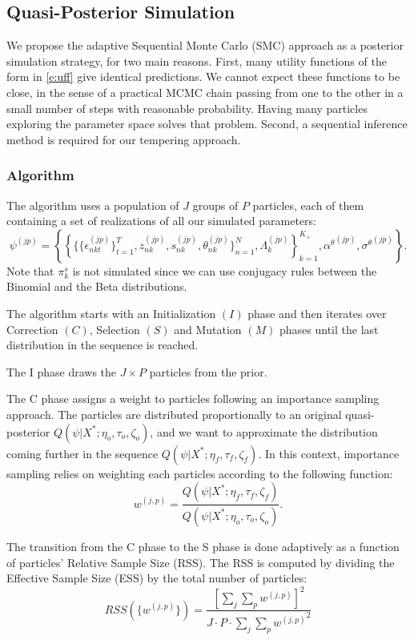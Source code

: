 \documentclass[12pt]{article}
\newcounter{thm}[section]
\begin{document}
\subsection{Quasi-Posterior Simulation}

We propose the adaptive Sequential Monte Carlo (SMC) approach \citep{DurhamGeweke2014adaptive} as a posterior simulation strategy, for two main reasons.
First, many utility functions of the form in \eqref{e:uff} give identical predictions.
We cannot expect these functions to be close, in the sense of a practical MCMC chain passing from one to the other in a small number of steps with reasonable probability. Having many particles exploring the parameter space solves that problem.
Second, a sequential inference method is required for our tempering approach.


\subsubsection{Algorithm}

The algorithm uses a population of $J$ groups of $P$ particles, each of them containing a set of realizations of all our simulated parameters: $$\psi^{(jp)} = \left\{ \left\{ \{\{\epsilon_{nkt}^{(jp)}\}_{t=1}^T, z_{nk}^{(jp)},s_{nk}^{(jp)}, \theta_{nk}^{(jp)} \}_{n=1}^N, \Lambda_{k}^{(jp)} \right\}_{k=1}^{K_+},{\alpha^\theta}^{(jp)}, {\sigma^\theta}^{(jp)} \right\}.$$
Note that ${\pi_k^s}$ is not simulated since we can use conjugacy rules between the Binomial and the Beta distributions.

The algorithm starts with an Initialization $(I)$ phase and then iterates over Correction $(C)$, Selection $(S)$ and Mutation $(M)$ phases until the last distribution in the sequence is reached. 

The I phase draws the $J\times P$ particles from the prior.

The C phase assigns a weight to particles following an importance sampling approach. The particles are distributed proportionally to an original quasi-posterior $Q(\psi|X^*;\eta_o,\tau_o,\zeta_o)$, and we want to approximate the distribution coming further in the sequence $Q(\psi|X^*; \eta_f,\tau_f,\zeta_f)$. In this context, importance sampling relies on weighting each particles according to the following function:
$$ w^{(j,p)} = \frac{Q(\psi|X^*;\eta_f,\tau_f,\zeta_f)}{Q(\psi|X^*;\eta_o,\tau_o,\zeta_o)}.$$

The transition from the C phase to the S phase is done adaptively as a function of particles' Relative Sample Size (RSS). The RSS is computed by dividing the Effective Sample Size (ESS) by the total number of particles:
$$ RSS(\{ w^{(j,p)}\}) = \frac{[\sum_j \sum_p  w^{(j,p)} ]^2}{ J \cdot P \cdot \sum_j \sum_p  {w^{(j,p)}}^2 } $$
\end{document}

